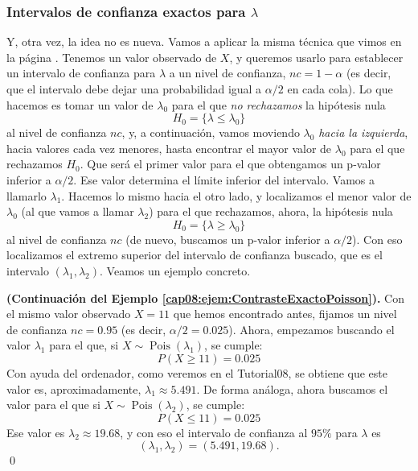 \subsubsection{Intervalos de confianza exactos para $\lambda$}
\label{cap08:subsubsec:IntervaloConfianzaExactoLambdaPoisson}

Y, otra vez, la idea no es nueva. Vamos a aplicar la misma técnica que vimos en la página \pageref{cap08:subsubsec:IntervaloConfianzaExactoPBinomial}. Tenemos un valor observado de $X$, y queremos usarlo para establecer un intervalo de confianza para $\lambda$ a un nivel de confianza, $nc=1-\alpha$ (es decir, que el intervalo debe dejar una probabilidad igual a $\alpha/2$ en cada cola). Lo que hacemos es tomar un valor de $\lambda_0$ para el que {\em no rechazamos} la hipótesis nula
\[H_0=\{ \lambda \leq  \lambda_0\}\]
al nivel de confianza $nc$, y, a continuación, vamos moviendo $\lambda_0$ {\em hacia la izquierda}, hacia valores cada vez menores, hasta encontrar el mayor valor de $\lambda_0$ para el que rechazamos $H_0$. Que será el primer valor para el que obtengamos un p-valor inferior a $\alpha/2$. Ese valor determina el límite inferior del intervalo. Vamos a llamarlo $\lambda_1$. Hacemos lo mismo hacia el otro lado, y localizamos el menor valor de $\lambda_0$ (al que vamos a llamar $\lambda_2$) para el que rechazamos, ahora, la hipótesis nula
\[H_0=\{ \lambda \geq  \lambda_0\}\]
al nivel de confianza $nc$ (de nuevo, buscamos un p-valor inferior a $\alpha/2$). Con eso localizamos el extremo superior del intervalo de confianza buscado, que es el intervalo $(\lambda_1,\lambda_2)$. Veamos un ejemplo concreto.
\begin{ejemplo}{\bf (Continuación del Ejemplo \ref{cap08:ejem:ContrasteExactoPoisson}).}
\label{cap08:ejem:ContrasteExactoPoisson2}
Con el mismo valor observado $X=11$ que hemos encontrado antes, fijamos un nivel de confianza $nc=0.95$ (es decir, $\alpha/2=0.025$). Ahora, empezamos buscando el valor $\lambda_1$ para el que, si $X\sim \operatorname{Pois}(\lambda_1)$, se cumple:
\[
    P(X\geq 11)=0.025
\]
Con ayuda del ordenador, como veremos en el Tutorial08, se obtiene que este valor es, aproximadamente, $\lambda_1\approx 5.491$. De forma análoga, ahora buscamos el valor para el que
si $X\sim \operatorname{Pois}(\lambda_2)$, se cumple:
\[
    P(X\leq 11)=0.025
\]
Ese valor es $\lambda_2\approx 19.68$, y con eso el intervalo de confianza al $95\%$ para $\lambda$ es \[(\lambda_1,\lambda_2)=(5.491,19.68).\]
\qed
\end{ejemplo}



